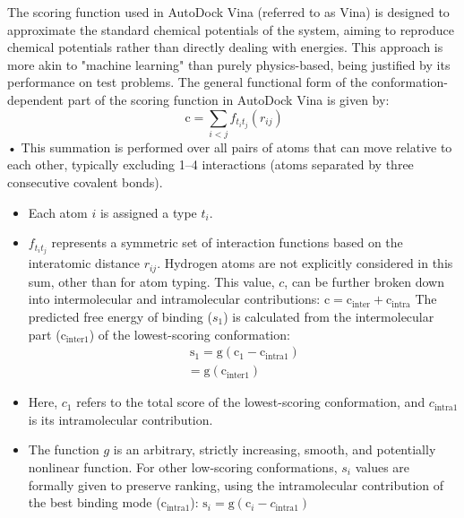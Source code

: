 \documentclass[11pt]{article}
\begin{document}
The scoring function used in AutoDock Vina (referred to as Vina) is designed to approximate the standard chemical potentials of the system, aiming to reproduce chemical potentials rather than directly dealing with energies. This approach is more akin to "machine learning" than purely physics-based, being justified by its performance on test problems.
The general functional form of the conformation-dependent part of the scoring function in AutoDock Vina is given by: 
\begin{equation} \label{eq:vinascoring-1}
\ \text{c} = \sum_{i<j} f_{t_i t_j} (r_{ij})
\end{equation}
• This summation is performed over all pairs of atoms that can move relative to each other, typically excluding 1–4 interactions (atoms separated by three consecutive covalent bonds).
\begin{itemize}
\item Each atom $i$ is assigned a type $t_i$.
\item $f_{t_i t_j}$ represents a symmetric set of interaction functions based on the interatomic distance $r_{ij}$. Hydrogen atoms are not explicitly considered in this sum, other than for atom typing.
This value, $c$, can be further broken down into intermolecular and intramolecular contributions: $\text{c} = \text{c}_{\text{inter}} + \text{c}_{\text{intra}}$
The predicted free energy of binding ($s_1$) is calculated from the intermolecular part ($\text{c}_{\text{inter}1}$) of the lowest-scoring conformation: 
\begin{equation} \label{eq:vinascoring-2}
\begin{split}
\ \text{s}_1 = \text{g}(\text{c}_1 - \text{c}_{\text{intra}1}) \\ 
            = \text{g}(\text{c}_{\text{inter}1})
\end{split}
\end{equation}

\item Here, $c_1$ refers to the total score of the lowest-scoring conformation, and $c_{\text{intra}1}$ is its intramolecular contribution.
\item The function $g$ is an arbitrary, strictly increasing, smooth, and potentially nonlinear function.
For other low-scoring conformations, $s_i$ values are formally given to preserve ranking, using the intramolecular contribution of the best binding mode ($\text{c}_{\text{intra}1}$): $\text{s}_i = \text{g}(\text{c}_i - c_{\text{intra}1})$
\end{itemize}
\end{document}
